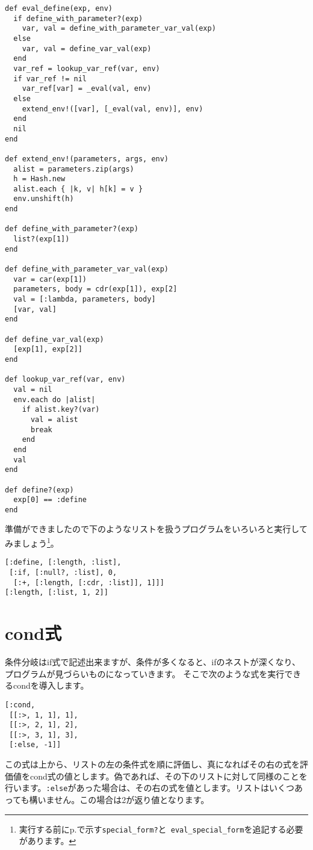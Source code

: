 \begin{lstlisting}
def eval_define(exp, env)
  if define_with_parameter?(exp)
    var, val = define_with_parameter_var_val(exp)
  else
    var, val = define_var_val(exp)
  end
  var_ref = lookup_var_ref(var, env)
  if var_ref != nil
    var_ref[var] = _eval(val, env)
  else
    extend_env!([var], [_eval(val, env)], env)
  end
  nil
end

def extend_env!(parameters, args, env)
  alist = parameters.zip(args)
  h = Hash.new
  alist.each { |k, v| h[k] = v }
  env.unshift(h)
end

def define_with_parameter?(exp)
  list?(exp[1])
end

def define_with_parameter_var_val(exp)
  var = car(exp[1])
  parameters, body = cdr(exp[1]), exp[2]
  val = [:lambda, parameters, body]
  [var, val]
end

def define_var_val(exp)
  [exp[1], exp[2]]
end

def lookup_var_ref(var, env)
  val = nil
  env.each do |alist|  
    if alist.key?(var)
      val = alist
      break 
    end
  end
  val
end  

def define?(exp)
  exp[0] == :define
end
\end{lstlisting}

準備ができましたので下のようなリストを扱うプログラムをいろいろと実行してみましょう\footnote{実行する前にp.\pageref{sec:quote}で示す{\tt special\_form?}と{\tt 
eval\_special\_form}を追記する必要があります。}。

\begin{lstlisting}
[:define, [:length, :list], 
 [:if, [:null?, :list], 0, 
  [:+, [:length, [:cdr, :list]], 1]]]
[:length, [:list, 1, 2]]
\end{lstlisting}

\section{cond式}

条件分岐はif式で記述出来ますが、条件が多くなると、ifのネストが深くなり、プログラムが見づらいものになっていきます。
そこで次のような式を実行できるcondを導入します。

\begin{lstlisting}
[:cond, 
 [[:>, 1, 1], 1],
 [[:>, 2, 1], 2],
 [[:>, 3, 1], 3],
 [:else, -1]]
\end{lstlisting}

この式は上から、リストの左の条件式を順に評価し、真になればその右の式を評価値をcond式の値とします。偽であれば、その下のリストに対して同様のことを行います。{\tt :else}があった場合は、その右の式を値とします。リストはいくつあっても構いません。この場合は2が返り値となります。

